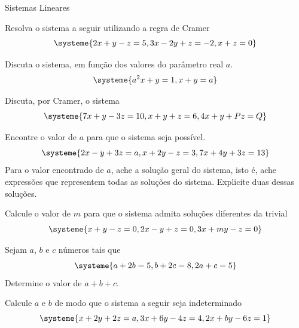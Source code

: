 \begin{exercicios}{Sistemas Lineares}
    \begin{exercicio}
        Resolva o sistema a seguir utilizando a regra de Cramer
        \[\systeme{
        	2x + y - z  = 5,
        	3x - 2y + z = -2,
        	x + z       = 0}
        \]
    \end{exercicio}
    
    \begin{exercicio}
        Discuta o sistema, em função dos valores do parâmetro real $a$.
        \[\systeme{
            a^2x + y = 1,
            x + y    = a}
        \]
    \end{exercicio}
    
    \begin{exercicio}
        Discuta, por Cramer, o sistema
        \[\systeme{
            7x + y - 3z = 10,
            x + y + z   = 6,
            4x + y + Pz = Q}
        \]
    \end{exercicio}
    
    \begin{exercicio}
        Encontre o valor de $a$ para que o sistema seja possível. 
        \[\systeme{
            2x - y + 3z  = a,
            x + 2y - z   = 3,
            7x + 4y + 3z = 13}
        \]
        Para o valor encontrado de $a$, ache a solução geral do sistema, isto é, 
        ache expressões que representem todas as soluções do sistema. 
        Explicite duas dessas soluções.		
    \end{exercicio}
    
    \begin{exercicio}
        Calcule o valor de $m$ para que o sistema admita soluções diferentes da trivial
        \[\systeme{
            x + y - z   = 0,
            2x - y + z  = 0,
            3x + my - z = 0}
        \]
    \end{exercicio}
    
    \begin{exercicio}
        Sejam $a$, $b$ e $c$ números tais que
        \[\systeme{
            a + 2b = 5,
            b + 2c = 8,
            2a + c = 5}
        \]
        Determine o valor de $a + b + c$.		
    \end{exercicio}
    
    \begin{exercicio}
        Calcule $a$ e $b$ de modo que o sistema a seguir seja indeterminado
        \[\systeme{
            x + 2y + 2z  = a,
            3x + 6y - 4z = 4,
            2x + by - 6z = 1}
        \]
    \end{exercicio}
    

\end{exercicios}
